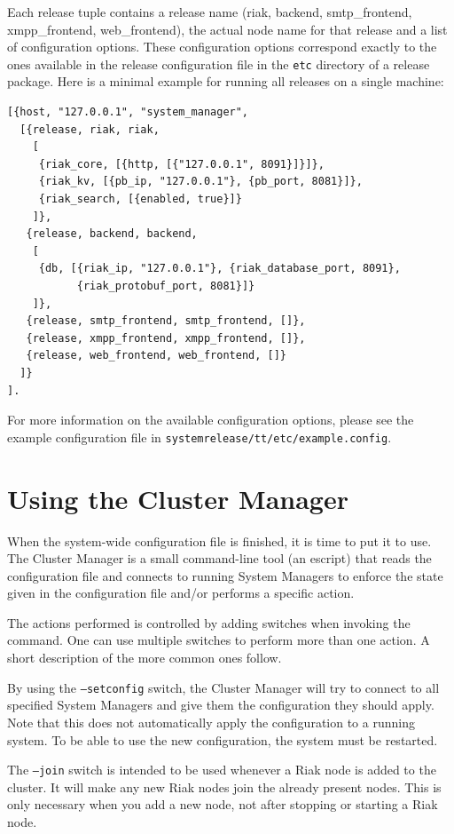 \documentclass[11pt,a4paper]{report}
\begin{document}
Each release tuple contains a release name (riak, backend, smtp\_frontend,
xmpp\_frontend, web\_frontend), the actual node name for that release and a list
of configuration options. These configuration options correspond exactly to the
ones available in the release configuration file in the {\tt etc} directory of a
release package. Here is a minimal example for running all releases on a single
machine:

\begin{Verbatim}[samepage=true]
[{host, "127.0.0.1", "system_manager",
  [{release, riak, riak,
    [
     {riak_core, [{http, [{"127.0.0.1", 8091}]}]},
     {riak_kv, [{pb_ip, "127.0.0.1"}, {pb_port, 8081}]},
     {riak_search, [{enabled, true}]}
    ]},
   {release, backend, backend,
    [
     {db, [{riak_ip, "127.0.0.1"}, {riak_database_port, 8091},
           {riak_protobuf_port, 8081}]}
    ]},
   {release, smtp_frontend, smtp_frontend, []},
   {release, xmpp_frontend, xmpp_frontend, []},
   {release, web_frontend, web_frontend, []}
  ]}
].
\end{Verbatim}

\begin{sloppypar}
For more information on the available configuration options, please see the
example configuration file in {\tt system\-release/tt/etc/example.config}.
\end{sloppypar}
\section{Using the Cluster Manager}
When the system-wide configuration file is finished, it is time to put it to
use. The Cluster Manager is a small command-line tool (an escript) that reads
the configuration file and connects to running System Managers to enforce the
state given in the configuration file and/or performs a specific action.

The actions performed is controlled by adding switches when invoking the
command. One can use multiple switches to perform more than one action. A short
description of the more common ones follow.

By using the {\tt --setconfig} switch, the Cluster Manager will try to connect
to all specified System Managers and give them the configuration they should
apply. Note that this does not automatically apply the configuration to a
running system. To be able to use the new configuration, the system must be
restarted.

The {\tt --join} switch is intended to be used whenever a Riak node is added to
the cluster. It will make any new Riak nodes join the already present
nodes. This is only necessary when you add a new node, not after stopping or
starting a Riak node.
\end{document}
